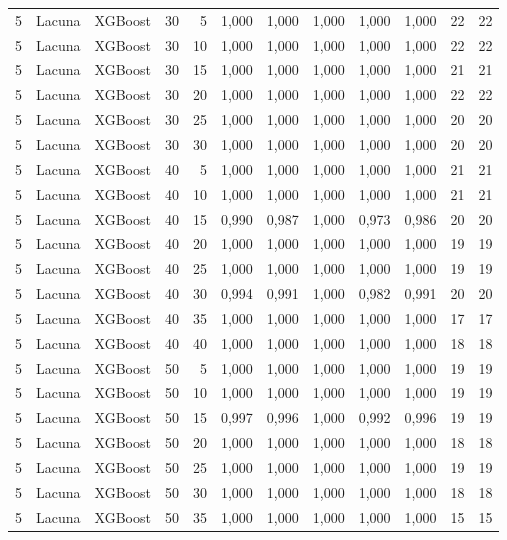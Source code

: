 \begin{longtable}{ccclrrrrrrrr}
5 & Lacuna & XGBoost & 30 & 5 & 1,000 & 1,000 & 1,000 & 1,000 & 1,000 & 22 & 22 \\
5 & Lacuna & XGBoost & 30 & 10 & 1,000 & 1,000 & 1,000 & 1,000 & 1,000 & 22 & 22 \\
5 & Lacuna & XGBoost & 30 & 15 & 1,000 & 1,000 & 1,000 & 1,000 & 1,000 & 21 & 21 \\
5 & Lacuna & XGBoost & 30 & 20 & 1,000 & 1,000 & 1,000 & 1,000 & 1,000 & 22 & 22 \\
5 & Lacuna & XGBoost & 30 & 25 & 1,000 & 1,000 & 1,000 & 1,000 & 1,000 & 20 & 20 \\
5 & Lacuna & XGBoost & 30 & 30 & 1,000 & 1,000 & 1,000 & 1,000 & 1,000 & 20 & 20 \\
5 & Lacuna & XGBoost & 40 & 5 & 1,000 & 1,000 & 1,000 & 1,000 & 1,000 & 21 & 21 \\
5 & Lacuna & XGBoost & 40 & 10 & 1,000 & 1,000 & 1,000 & 1,000 & 1,000 & 21 & 21 \\
5 & Lacuna & XGBoost & 40 & 15 & 0,990 & 0,987 & 1,000 & 0,973 & 0,986 & 20 & 20 \\
5 & Lacuna & XGBoost & 40 & 20 & 1,000 & 1,000 & 1,000 & 1,000 & 1,000 & 19 & 19 \\
5 & Lacuna & XGBoost & 40 & 25 & 1,000 & 1,000 & 1,000 & 1,000 & 1,000 & 19 & 19 \\
5 & Lacuna & XGBoost & 40 & 30 & 0,994 & 0,991 & 1,000 & 0,982 & 0,991 & 20 & 20 \\
5 & Lacuna & XGBoost & 40 & 35 & 1,000 & 1,000 & 1,000 & 1,000 & 1,000 & 17 & 17 \\
5 & Lacuna & XGBoost & 40 & 40 & 1,000 & 1,000 & 1,000 & 1,000 & 1,000 & 18 & 18 \\
5 & Lacuna & XGBoost & 50 & 5 & 1,000 & 1,000 & 1,000 & 1,000 & 1,000 & 19 & 19 \\
5 & Lacuna & XGBoost & 50 & 10 & 1,000 & 1,000 & 1,000 & 1,000 & 1,000 & 19 & 19 \\
5 & Lacuna & XGBoost & 50 & 15 & 0,997 & 0,996 & 1,000 & 0,992 & 0,996 & 19 & 19 \\
5 & Lacuna & XGBoost & 50 & 20 & 1,000 & 1,000 & 1,000 & 1,000 & 1,000 & 18 & 18 \\
5 & Lacuna & XGBoost & 50 & 25 & 1,000 & 1,000 & 1,000 & 1,000 & 1,000 & 19 & 19 \\
5 & Lacuna & XGBoost & 50 & 30 & 1,000 & 1,000 & 1,000 & 1,000 & 1,000 & 18 & 18 \\
5 & Lacuna & XGBoost & 50 & 35 & 1,000 & 1,000 & 1,000 & 1,000 & 1,000 & 15 & 15 \\

\end{longtable}
